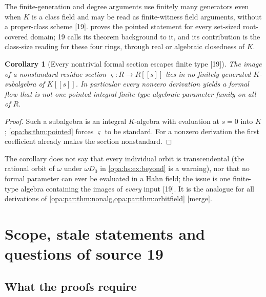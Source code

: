 \documentclass[11pt,oneside]{article}
\numberwithin{equation}{section}
\newtheorem{corollary}[corollary]{Corollary}
\theoremstyle{definition}
\theoremstyle{remark}
\newcommand{\src}[1]{\textup{\textsf{\small[#1]}}}
\newcommand{\mergetag}{\textup{\textsf{\small[merge]}}}
\begin{document}
The finite-generation and degree arguments use finitely many generators even when $K$ is a class field and may be read as finite-witness field
arguments, without a proper-class scheme \src{19}.  proves the pointed statement for every set-sized root-covered domain; 19
calls its theorem background to it, and its contribution is the class-size reading for these four rings, through real or algebraic closedness of $K$.

\begin{corollary}[Every nontrivial formal section escapes finite type \src{19}]\label{opa:hs:cor:escape}
The image of a nonstandard residue section $\varsigma:R\to R[[s]]$ lies in no finitely generated $K$-subalgebra of $K[[s]]$. In particular every nonzero
derivation yields a formal flow that is not one pointed integral finite-type algebraic parameter family on all of $R$.
\end{corollary}
\begin{proof}
Such a subalgebra is an integral $K$-algebra with evaluation at $s=0$ into $K$; \cref{opa:hs:thm:pointed} forces $\varsigma$ to be standard. For a nonzero
derivation the first coefficient already makes the section nonstandard.
\end{proof}

The corollary does not say that every individual orbit is transcendental (the rational orbit of $\omega$ under $\omega D_0$ in \cref{opa:hs:ex:beyond}
is a warning), nor that no formal parameter can ever be evaluated in a Hahn field; the issue is one finite-type algebra containing the images of
\emph{every} input \src{19}. It is the analogue for all derivations of \cref{opa:par:thm:nonalg,opa:par:thm:orbitfield} \mergetag.

\section{Scope, stale statements and questions of source 19}\label{opa:hs:sec:questions}

\subsection{What the proofs require}
\end{document}
